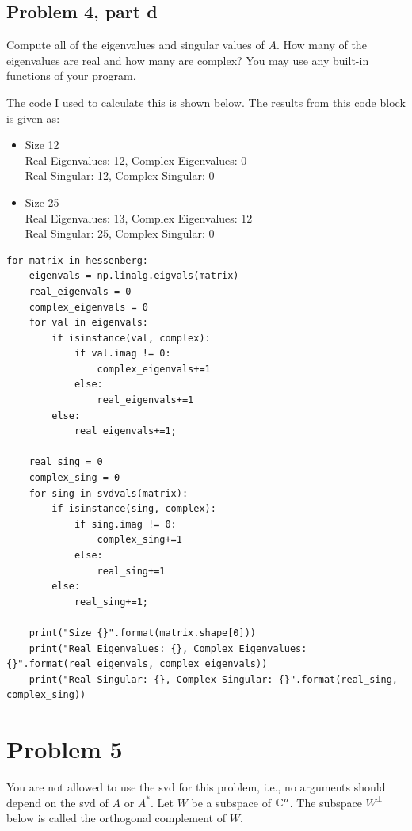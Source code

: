 \newpage
\subsection{Problem 4, part d}
Compute all of the eigenvalues and singular values of $A$. How many of the eigenvalues are real and how many are complex? You may use any built-in functions of your program.
\partbreak
\begin{solution}

    The code I used to calculate this is shown below. The results from this code block is given as:
\begin{itemize}
    \item Size 12\\
          Real Eigenvalues: 12, Complex Eigenvalues: 0\\
          Real Singular: 12, Complex Singular: 0\\
    \item Size 25\\
          Real Eigenvalues: 13, Complex Eigenvalues: 12\\
          Real Singular: 25, Complex Singular: 0
\end{itemize}
\newpage
\begin{lstlisting}
for matrix in hessenberg:
    eigenvals = np.linalg.eigvals(matrix)
    real_eigenvals = 0
    complex_eigenvals = 0
    for val in eigenvals:
        if isinstance(val, complex):
            if val.imag != 0:
                complex_eigenvals+=1
            else:
                real_eigenvals+=1
        else:
            real_eigenvals+=1;
    
    real_sing = 0
    complex_sing = 0
    for sing in svdvals(matrix):
        if isinstance(sing, complex):
            if sing.imag != 0:
                complex_sing+=1
            else:
                real_sing+=1
        else:
            real_sing+=1;
            
    print("Size {}".format(matrix.shape[0]))
    print("Real Eigenvalues: {}, Complex Eigenvalues: {}".format(real_eigenvals, complex_eigenvals))
    print("Real Singular: {}, Complex Singular: {}".format(real_sing, complex_sing))
    \end{lstlisting}
\end{solution}
\newpage
\section{Problem 5}
You are not allowed to use the svd for this problem, i.e., no arguments should depend on the svd of $A$ or $A^*$. Let $W$ be a subspace of $\mathbb{C}^n$. The subspace $W^ \perp $ below is called the orthogonal complement of $W$.

